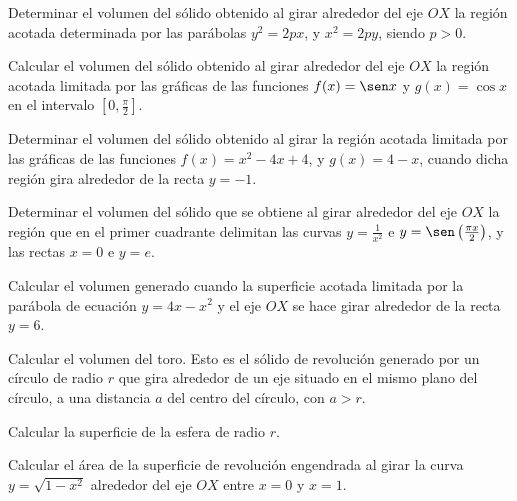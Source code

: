 \begin{ejercicio}
    Determinar el volumen del sólido obtenido al girar alrededor del eje $OX$ la región acotada determinada por las parábolas $y^2=2px$, y $x^2=2py$, siendo $p>0$.
\end{ejercicio}

\begin{ejercicio}
    Calcular el volumen del sólido obtenido al girar alrededor del eje $OX$ la región acotada limitada por las gráficas de las funciones $f(x)=\sen x$ y $g(x)=\cos x$ en el intervalo $\left[0,\frac{\pi}{2}\right]$.
\end{ejercicio}

\begin{ejercicio}
    Determinar el volumen del sólido obtenido al girar la región acotada limitada por las gráficas de las funciones $f(x)=x^2-4x+4$, y $g(x)=4-x$, cuando dicha región gira alrededor de la recta $y=-1$.
\end{ejercicio}

\begin{ejercicio}
    Determinar el volumen del sólido que se obtiene al girar alrededor del eje $OX$ la región que en el primer cuadrante delimitan las curvas $y=\frac{1}{x^2}$ e $y=\sen \left(\frac{\pi x}{2}\right)$, y las rectas $x=0$ e $y=e$.
\end{ejercicio}

\begin{ejercicio}
    Calcular el volumen generado cuando la superficie acotada limitada por la parábola de ecuación $y=4x-x^2$ y el eje $OX$ se hace girar alrededor de la recta $y=6$.
\end{ejercicio}

\begin{ejercicio}
    Calcular el volumen del toro. Esto es el sólido de revolución generado por un círculo de radio $r$ que gira alrededor de un eje situado en el mismo plano del círculo, a una distancia $a$ del centro del círculo, con $a>r$.
\end{ejercicio}

\begin{ejercicio}
    Calcular la superficie de la esfera de radio $r$.
\end{ejercicio}

\begin{ejercicio}
    Calcular el área de la superficie de revolución engendrada al girar la curva $y=\sqrt{1-x^2}$ alrededor del eje $OX$ entre $x=0$ y $x=1$.
\end{ejercicio}

